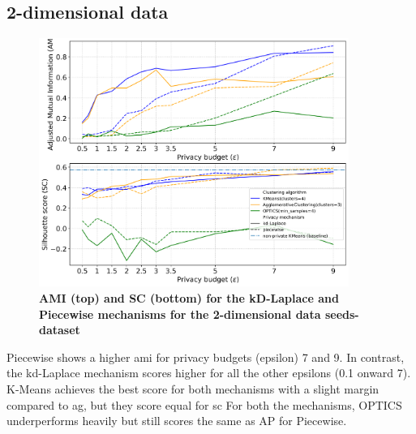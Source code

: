 \subsection{2-dimensional data}
\begin{figure}[H]
  \centering
  \caption{\textbf{AMI (top) and SC (bottom) for the kD-Laplace and Piecewise mechanisms for the 2-dimensional data seeds-dataset}}
  \includegraphics[width=0.9\textwidth]{Results/kd-laplace/kd-Laplace/seeds-dataset/ami-and-sc_2_dimensions.png}

  \label{fig:validation-seeds-dataset_comparison_2d-laplace}
\end{figure}
Piecewise shows a higher \gls{ami} for privacy budgets (epsilon) 7 and 9. In contrast, the kd-Laplace mechanism scores higher for all the other epsilons (0.1 onward 7).
K-Means achieves the best score for both mechanisms with a slight margin compared to \gls{ag}, but they score equal for \gls{sc}
For both the mechanisms, OPTICS underperforms heavily but still scores the same as AP for Piecewise.
\newpage
